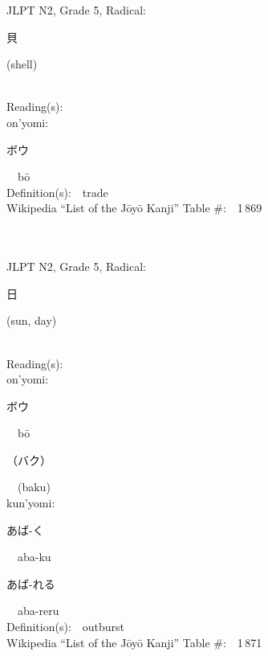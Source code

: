 \begin{multicols}{2}
{JLPT N2, Grade 5, Radical:\ \ {\begin{CJK}{UTF8}{min} 貝 \end{CJK}} (shell) } \\
Reading(s):\ \ \\
{\hspace*{1em}}on'yomi:\ \ \\
{\hspace*{2em}}{\begin{CJK}{UTF8}{min} ボウ \end{CJK}}\ \ b\=o\ \ \\
Definition(s):\ \ trade \\
Wikipedia ``List of the J\=oy\=o Kanji'' Table \#:\ \ 1\,869 \\
\ \ \\
{\fontsize{34pt}{40pt}  }\ \ \\  %
{JLPT N2, Grade 5, Radical:\ \ {\begin{CJK}{UTF8}{min} 日 \end{CJK}} (sun, day) } \\
Reading(s):\ \ \\
{\hspace*{1em}}on'yomi:\ \ \\
{\hspace*{2em}}{\begin{CJK}{UTF8}{min} ボウ \end{CJK}}\ \ b\=o\ \ \\
{\hspace*{2em}}{\begin{CJK}{UTF8}{min} （バク） \end{CJK}}\ \ (baku)\ \ \\
{\hspace*{1em}}kun'yomi:\ \ \\
{\hspace*{2em}}{\begin{CJK}{UTF8}{min} あば-く \end{CJK}}\ \ aba-ku\ \ \\
{\hspace*{2em}}{\begin{CJK}{UTF8}{min} あば-れる \end{CJK}}\ \ aba-reru\ \ \\
Definition(s):\ \ outburst \\
Wikipedia ``List of the J\=oy\=o Kanji'' Table \#:\ \ 1\,871 \\

\end{multicols}
